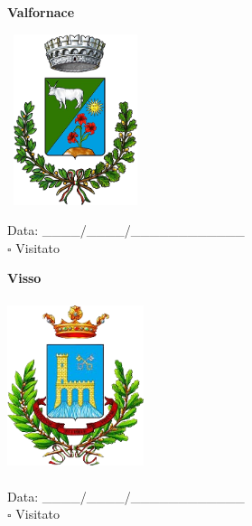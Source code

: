 \documentclass[a5paper,12pt]{article}
\begin{document}
\vspace{0.7cm}

\noindent
\begin{minipage}[t]{0.45\textwidth}
    \begin{center}
        \textbf{Valfornace}
    \end{center}
    \vspace{-0.5cm} %
    \begin{center}
        \includegraphics[height= 5cm, width=4cm]{Marche/Stemma Valfornace.png}
    \end{center}
    \vspace{-0.4cm} %
    \begin{flushleft}
        Data: \_\_\_\_/\_\_\_\_/\_\_\_\_\_\_\_\_\_\_\_\_ \\
        $\square$ Visitato
    \end{flushleft}
\end{minipage}
\hfill
\noindent
\begin{minipage}[t]{0.45\textwidth}
    \begin{center}
        \textbf{Visso}
    \end{center}
    \vspace{-0.5cm} %
    \begin{center}
        \includegraphics[height= 5cm, width=4cm]{Marche/Stemma Visso.png}
    \end{center}
    \vspace{-0.4cm} %
    \begin{flushleft}
        Data: \_\_\_\_/\_\_\_\_/\_\_\_\_\_\_\_\_\_\_\_\_ \\
        $\square$ Visitato
    \end{flushleft}
\end{minipage}
\hfill
\end{document}
